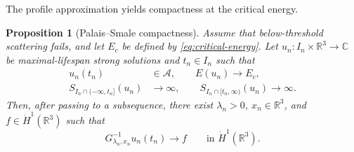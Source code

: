 \documentclass{interact}
\numberwithin{equation}{section}
\theoremstyle{plain}
\newtheorem{proposition}[theorem]{Proposition}
\theoremstyle{definition}
\theoremstyle{remark}
\newcommand{\R}{\mathbb R}
\newcommand{\C}{\mathbb C}
\begin{document}
The profile approximation yields compactness at the critical energy.

\begin{proposition}[Palais--Smale compactness]\label{prop:palais-smale-energy}
Assume that below-threshold scattering fails, and let $E_c$ be defined by \eqref{eq:critical-energy}. Let $u_n:I_n\times\R^3\to\C$ be maximal-lifespan strong solutions and $t_n\in I_n$ such that
\begin{align}
 u_n(t_n)&\in\mathcal A,
 \qquad E(u_n)\longrightarrow E_c,
 \label{eq:PS-energy-assumptions}\\
 S_{I_n\cap(-\infty,t_n]}(u_n)&\longrightarrow\infty,
 \qquad
 S_{I_n\cap[t_n,\infty)}(u_n)\longrightarrow\infty.
 \label{eq:PS-directional-blowup}
\end{align}
Then, after passing to a subsequence, there exist $\lambda_n>0$, $x_n\in\R^3$, and $f\in\dot H^1(\R^3)$ such that
\begin{equation}\label{eq:PS-strong-conclusion}
 G_{\lambda_n,x_n}^{-1}u_n(t_n)
 \longrightarrow f
 \qquad\text{in }\dot H^1(\R^3).
\end{equation}
\end{proposition}
\end{document}
